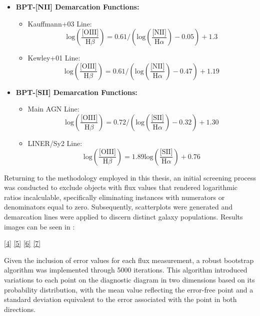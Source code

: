 \begin{itemize}
    \item \textbf{BPT-[NII] Demarcation Functions:}
    \begin{itemize}
        \item Kauffmann+03 Line: \[ \text{log}(\frac{\text{[OIII]}}{\text{H}\beta}) = 0.61 / (\text{log}(\frac{\text{[NII]}}{\text{H}\alpha}) - 0.05) + 1.3 \]
        \item Kewley+01 Line: \[ \text{log}(\frac{\text{[OIII]}}{\text{H}\beta}) = 0.61 / (\text{log}(\frac{\text{[NII]}}{\text{H}\alpha}) - 0.47) + 1.19 \]
    \end{itemize}

    \item \textbf{BPT-[SII] Demarcation Functions:}
    \begin{itemize}
        \item Main AGN Line: \[ \text{log}(\frac{\text{[OIII]}}{\text{H}\beta}) = 0.72 / (\text{log}(\frac{\text{[SII]}}{\text{H}\alpha}) - 0.32) + 1.30 \]
        \item LINER/Sy2 Line: \[ \text{log}(\frac{\text{[OIII]}}{\text{H}\beta}) = 1.89 \text{log}(\frac{\text{[SII]}}{\text{H}\alpha}) + 0.76 \]
    \end{itemize}
\end{itemize}



Returning to the methodology employed in this thesis, an initial screening process was conducted to exclude objects with flux values that rendered logarithmic ratios incalculable, specifically eliminating instances with numerators or denominators equal to zero. Subsequently, scatterplots were generated and demarcation lines were applied to discern distinct galaxy populations.
Results images can be seen in :

\autoref{4} \autoref{5} \autoref{6} \autoref{7}

Given the inclusion of error values for each flux measurement, a robust bootstrap algorithm was implemented through 5000 iterations. This algorithm introduced variations to each point on the diagnostic diagram in two dimensions based on its probability distribution, with the mean value reflecting the error-free point and a standard deviation equivalent to the error associated with the point in both directions.

